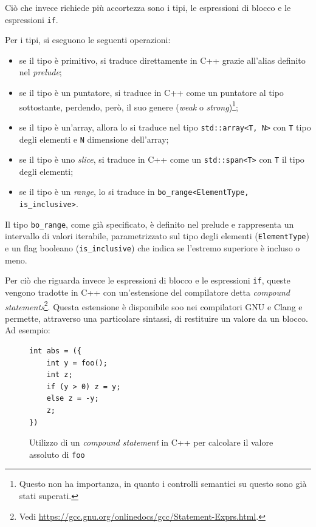 Ci\`o che invece richiede pi\`u accortezza sono i tipi, le espressioni di blocco e le espressioni \texttt{if}.

Per i tipi, si eseguono le seguenti operazioni:
\begin{itemize}
	\item se il tipo \`e primitivo, si traduce direttamente in C++ grazie all'alias definito nel \textit{prelude};
	\item se il tipo \`e un puntatore, si traduce in C++ come un puntatore al tipo sottostante, perdendo, per\`o, il suo genere (\textit{weak} o \textit{strong})\footnote{Questo non ha importanza, in quanto i controlli semantici su questo sono gi\`a stati superati.};
	\item se il tipo \`e un'array, allora lo si traduce nel tipo \texttt{std::array<T, N>} con \texttt{T} tipo degli elementi e \texttt{N} dimensione dell'array;
	\item se il tipo \`e uno \textit{slice}, si traduce in C++ come un \texttt{std::span<T>} con \texttt{T} il tipo degli elementi;
	\item se il tipo \`e un \textit{range}, lo si traduce in \newline \texttt{bo\_range<ElementType, is\_inclusive>}.
\end{itemize}

Il tipo \texttt{bo\_range}, come gi\`a specificato, \`e definito nel prelude e rappresenta un intervallo di valori iterabile, parametrizzato sul tipo degli elementi (\texttt{ElementType}) e un flag booleano (\texttt{is\_inclusive}) che indica se l'estremo superiore \`e incluso o meno.

Per ci\`o che riguarda invece le espressioni di blocco e le espressioni \texttt{if}, queste vengono tradotte in C++ con un'estensione del compilatore detta \textit{compound statements}\footnote{Vedi \url{https://gcc.gnu.org/onlinedocs/gcc/Statement-Exprs.html}.}. Questa estensione \`e disponibile soo nei compilatori GNU e Clang e permette, attraverso una particolare sintassi, di restituire un valore da un blocco. Ad esempio:
\begin{figure}[H]
	\centering
	\begin{verbatim}
int abs = ({
    int y = foo();
    int z;
    if (y > 0) z = y;
    else z = -y;
    z;
})
	\end{verbatim}
	\caption{Utilizzo di un \textit{compound statement} in C++ per calcolare il valore assoluto di \texttt{foo}}
	\label{fig:compound-statement-example}
\end{figure}

